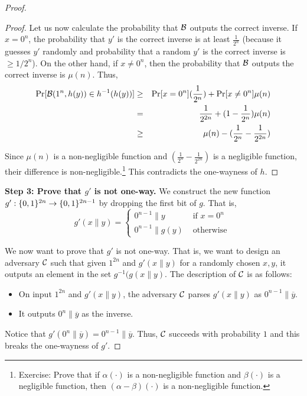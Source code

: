 \begin{proof}
\begin{proof}
Let us now calculate the probability that $\mathcal{B}$ outputs the correct inverse. If $x = 0^n$, the probability that $y'$ is the correct inverse is at least $\frac{1}{2^n}$ (because it guesses $y'$ randomly and probability that a random $y'$ is the correct inverse is $\geq 1/2^n$). On the other hand, if $x \neq 0^n$, then the probability that $\mathcal{B}$ outputs the correct inverse is $\mu(n)$. Thus,
\begin{eqnarray*}
\Pr[\mathcal{B}(1^n,h(y)) \in h^{-1}(h(y))] & \geq & \Pr[x = 0^n](\frac{1}{2^n}) + \Pr[x \neq 0^n]\mu(n)\\
& = & \frac{1}{2^{2n}} + (1 - \frac{1}{2^n}) \mu(n) \\
& \geq & \mu(n) - (\frac{1}{2^{n}} - \frac{1}{2^{2n}})
\end{eqnarray*}

Since $\mu(n)$ is a non-negligible function and $(\frac{1}{2^{n}} - \frac{1}{2^{2n}})$ is a negligible function, their difference is non-negligible.\footnote{Exercise: Prove that if $\alpha(\cdot)$ is a non-negligible function and $\beta(\cdot)$ is a negligible function, then $(\alpha - \beta)(\cdot)$ is a non-negligible function.} This contradicts the one-wayness of $h$.

\end{proof} 


\noindent\textbf{Step 3: Prove that $g'$ is not one-way.} 
We construct the new function $g': \{0,1\}^{2n} \rightarrow \{0,1\}^{2n-1}$ by dropping the first bit of $g$. That is,
$$
g'(x\|y) = \begin{cases}
 0^{n-1}\|y &\text{    if } x = 0^n\\
0^{n-1}\|g(y) &\text{    otherwise }
\end{cases}
$$

We now want to prove that $g'$ is not one-way. That is, we want to design an adversary $\mathcal{C}$ such that given $1^{2n}$ and $g'(x \| y)$ for a randomly chosen $x,y$, it outputs an element in the set $g^{-1}(g(x \| y)$. The description of $\mathcal{C}$ is as follows:

\begin{itemize}
\item On input $1^{2n}$ and $g'(x \| y)$, the adversary $\mathcal{C}$ parses $g'(x \| y)$ as $0^{n-1} \| \overline{y}$.
\item It outputs $0^{n} \| \overline{y}$ as the inverse.
\end{itemize}
Notice that $g'(0^{n} \| \overline{y}) = 0^{n-1} \| \overline{y}$. Thus, $\mathcal{C}$ succeeds with probability $1$ and this breaks the one-wayness of $g'$.

\end{proof}
